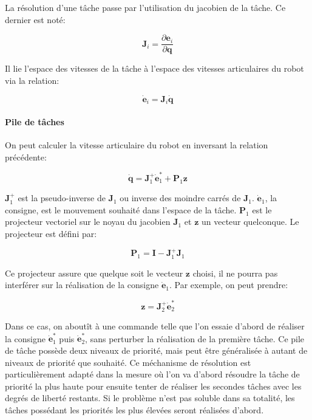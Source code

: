 La résolution d'une tâche passe par l'utilisation du jacobien de la
tâche. Ce dernier est noté:

\begin{equation}
  \mathbf{J}_i = \frac{\partial \mathbf{e}_i}{\partial \mathbf{q}}
\end{equation}

Il lie l'espace des vitesses de la tâche à l'espace des vitesses
articulaires du robot via la relation:

\begin{equation}
  \dot{\mathbf{e}}_i = \mathbf{J}_i \dot{\mathbf{q}}
\end{equation}


\paragraph{Pile de tâches}

On peut calculer la vitesse articulaire du robot en inversant la
relation précédente:

\begin{equation}
  \dot{\mathbf{q}} = \mathbf{J}_1^{+} \dot{\mathbf{e}}_1^{*} + \mathbf{P}_1 \mathbf{z}
\end{equation}

$\mathbf{J}_1^{+}$ est la pseudo-inverse de $\mathbf{J}_1$ ou inverse
des moindre carrés de $\mathbf{J}_1$. $\dot{\mathbf{e}}_1$, la
consigne, est le mouvement souhaité dans l'espace de la
tâche. $\mathbf{P}_1$ est le projecteur vectoriel sur le noyau du
jacobien $\mathbf{J}_1$ et $\mathbf{z}$ un vecteur quelconque. Le
projecteur est défini par:

\begin{equation}
  \mathbf{P}_1 = \mathbf{I} - \mathbf{J}_1^{+} \mathbf{J}_1
\end{equation}

Ce projecteur assure que quelque soit le vecteur $\mathbf{z}$ choisi,
il ne pourra pas interférer sur la réalisation de la consigne
$\dot{\mathbf{e}}_1$. Par exemple, on peut prendre:

\begin{equation}
  \mathbf{z} = \mathbf{J}_2^{+} \dot{\mathbf{e}}_2^{*}
\end{equation}

Dans ce cas, on aboutît à une commande telle que l'on essaie d'abord
de réaliser la consigne $\dot{\mathbf{e}}_1^{*}$ puis
$\dot{\mathbf{e}}_2^{*}$, sans perturber la réalisation de la première
tâche. Ce pile de tâche possède deux niveaux de priorité, mais peut
être généralisée à autant de niveaux de priorité que souhaité. Ce
méchanisme de résolution est particulièrement adapté dans la mesure où
l'on va d'abord résoudre la tâche de priorité la plus haute pour
ensuite tenter de réaliser les secondes tâches avec les degrés de
liberté restants. Si le problème n'est pas soluble dans sa totalité,
les tâches possédant les priorités les plus élevées seront réalisées
d'abord.


